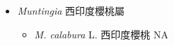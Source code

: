 
  \begin{itemize}
 \item[] \textit{Muntingia} 西印度櫻桃屬
                                
  \begin{itemize}
        \item[] \textit{M. calabura} L.  西印度櫻桃   NA
  \end{itemize}
  \end{itemize}
